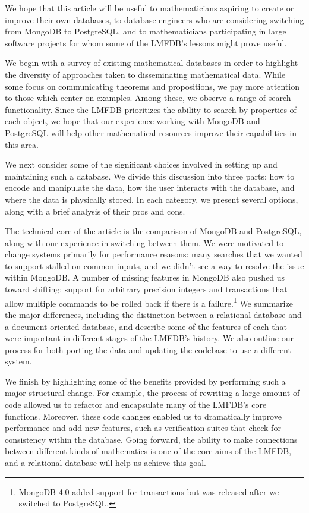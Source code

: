 \documentclass{amsart}
\begin{document}
We hope that this article will be useful to mathematicians aspiring to create or improve their own databases, to database engineers who are considering switching from MongoDB to PostgreSQL, and to mathematicians participating in large software projects for whom some of the LMFDB's lessons might prove useful.

We begin with a survey of existing mathematical databases in order to highlight the diversity of approaches taken to disseminating mathematical data.
While some focus on communicating theorems and propositions, we pay more attention to those which center on examples.
Among these, we observe a range of search functionality.
Since the LMFDB prioritizes the ability to search by properties of each object, we hope that our experience working with MongoDB and PostgreSQL will help other mathematical resources improve their capabilities in this area.

We next consider some of the significant choices involved in setting up and maintaining such a database.
We divide this discussion into three parts: how to encode and manipulate the data, how the user interacts with the database, and where the data is physically stored.
In each category, we present several options, along with a brief analysis of their pros and cons.

The technical core of the article is the comparison of MongoDB and PostgreSQL, along with our experience in switching between them.
We were motivated to change systems primarily for performance reasons: many searches that we wanted to support stalled on common inputs, and we didn't see a way to resolve the issue within MongoDB.
A number of missing features in MongoDB also pushed us toward shifting: support for arbitrary precision integers and transactions that allow multiple commands to be rolled back if there is a failure.\footnote{MongoDB 4.0 added support for transactions but was released after we switched to PostgreSQL.}
We summarize the major differences, including the distinction between a relational database and a document-oriented database, and describe some of the features of each that were important in different stages of the LMFDB's history.
We also outline our process for both porting the data and updating the codebase to use a different system.

We finish by highlighting some of the benefits provided by performing such a major structural change.
For example, the process of rewriting a large amount of code allowed us to refactor and encapsulate many of the LMFDB's core functions.
Moreover, these code changes enabled us to dramatically improve performance and add new features, such as verification suites that check for consistency within the database.
Going forward, the ability to make connections between different kinds of mathematics is one of the core aims of the LMFDB, and a relational database will help us achieve this goal.
\end{document}
